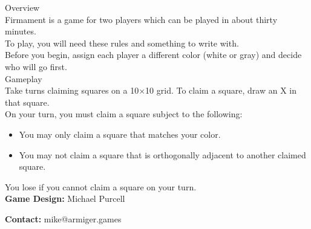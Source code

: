 \begin{minipage}{6cm}\raggedright
{\setmainfont[Scale=0.95]{Century Gothic-Bold}\LARGE Overview}\\[1.0ex]

\setmainfont{Tex Gyre Schola}
Firmament is a game for two players which can be played in about thirty minutes.\\[1.25ex]

To play, you will need these rules and something to write with.\\[1.25ex]

Before you begin, assign each player a different color (white or gray) and decide who will go first.\\[3ex]

{\setmainfont[Scale=0.95]{Century Gothic-Bold}\LARGE Gameplay}\\[1.0ex]

Take turns claiming squares on a 10$\times$10 grid. To claim a square, draw an {\setmainfont[Scale=0.95]{Century Gothic-Bold} X} in that square. \\[1.25ex]

On your turn, you must claim a square subject to the following:
\begin{itemize}[leftmargin=*]
	\item You may only claim a square that matches your color.
	\item You may not claim a square that is orthogonally adjacent to another claimed square.
\end{itemize}

You lose if you cannot claim a square on your turn.\\[1.25ex]

\textbf{Game Design:} Michael Purcell

\textbf{Contact:} mike@armiger.games
\end{minipage}